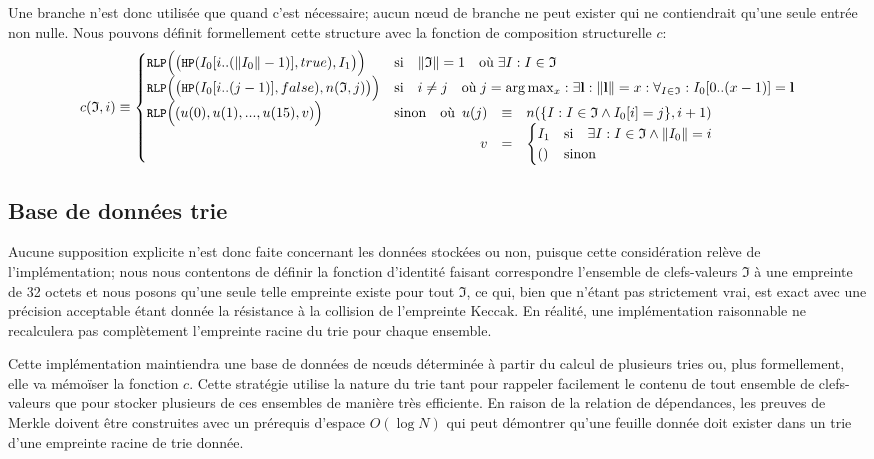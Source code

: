 \documentclass[9pt,oneside]{amsart}
\begin{document}
Une branche n'est donc utilisée que quand c'est nécessaire; aucun n\oe{}ud de branche ne peut exister qui ne contiendrait qu'une seule entrée non nulle. Nous pouvons définit formellement cette structure avec la fonction de composition structurelle $c$:
\begin{equation}
c(\mathfrak{I}, i) \equiv \begin{cases}
\texttt{\small RLP}\Big( \big(\texttt{\small HP}(I_0[i .. (\lVert I_0\rVert - 1)], true), I_1 \big) \Big) & \text{si} \quad \lVert \mathfrak{I} \rVert = 1 \quad \text{où} \; \exists I: I \in \mathfrak{I} \\
\texttt{\small RLP}\Big( \big(\texttt{\small HP}(I_0[i .. (j - 1)], false), n(\mathfrak{I}, j) \big) \Big) & \text{si} \quad i \ne j \quad \text{où} \; j = \arg \max_x : \exists \mathbf{l}: \lVert \mathbf{l} \rVert = x : \forall_{I \in \mathfrak{I}}: I_0[0 .. (x - 1)] = \mathbf{l} \\
\texttt{\small RLP}\Big( (u(0), u(1), ..., u(15), v) \Big) & \text{sinon} \quad \text{où} \begin{array}[t]{rcl}
u(j) & \equiv & n(\{ I : I \in \mathfrak{I} \wedge I_0[i] = j \}, i + 1) \\
v & = & \begin{cases}
I_1 & \text{si} \quad \exists I: I \in \mathfrak{I} \wedge \lVert I_0 \rVert = i \\
() & \text{sinon}
\end{cases}
\end{array}
\end{cases}
\end{equation}

\subsection{Base de données trie}
Aucune supposition explicite n'est donc faite concernant les données stockées ou non, puisque cette considération relève de l'implémentation; nous nous contentons de définir la fonction d'identité faisant correspondre l'ensemble de clefs-valeurs $\mathfrak{I}$ à une empreinte de 32 octets et nous posons qu'une seule telle empreinte existe pour tout $\mathfrak{I}$, ce qui, bien que n'étant pas strictement vrai, est exact avec une précision acceptable étant donnée la résistance à la collision de l'empreinte Keccak. En réalité, une implémentation raisonnable ne recalculera pas complètement l'empreinte racine du trie pour chaque ensemble.

Cette implémentation maintiendra une base de données de nœuds déterminée à partir du calcul de plusieurs tries ou, plus formellement, elle va mémoïser la fonction $c$. Cette stratégie utilise la nature du trie tant pour rappeler facilement le contenu de tout ensemble de clefs-valeurs que pour stocker plusieurs de ces ensembles de manière très efficiente. En raison de la relation de dépendances, les preuves de Merkle doivent être construites avec un prérequis d'espace $O(\log N)$ qui peut démontrer qu'une feuille donnée doit exister dans un trie d'une empreinte racine de trie donnée.
\end{document}
